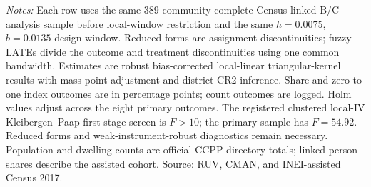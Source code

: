 \parbox{0.97\linewidth}{\footnotesize \textit{Notes:} Each row uses the same 389-community complete Census-linked B/C analysis sample before local-window restriction and the same \(h=0.0075\), \(b=0.0135\) design window. Reduced forms are assignment discontinuities; fuzzy LATEs divide the outcome and treatment discontinuities using one common bandwidth. Estimates are robust bias-corrected local-linear triangular-kernel results with mass-point adjustment and district CR2 inference. Share and zero-to-one index outcomes are in percentage points; count outcomes are logged. Holm values adjust across the eight primary outcomes. The registered clustered local-IV Kleibergen--Paap first-stage screen is \(F>10\); the primary sample has \(F=54.92\). Reduced forms and weak-instrument-robust diagnostics remain necessary. Population and dwelling counts are official CCPP-directory totals; linked person shares describe the assisted cohort. Source: RUV, CMAN, and INEI-assisted Census 2017.}
\par{}\par\endgroup
